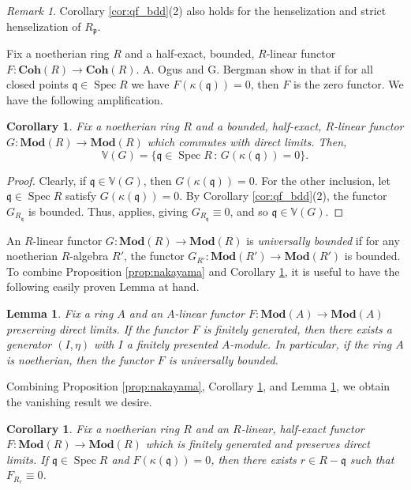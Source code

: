 \documentclass{amsart}
\theoremstyle{plain}
\newtheorem{cor}[thm]{Corollary}
\newtheorem{lem}[thm]{Lemma}
\theoremstyle{definition}
\theoremstyle{remark}
\newtheorem{rem}[thm]{Remark}
\numberwithin{equation}{section}
\newcommand{\suchthat}{\,:\,}
\DeclareMathOperator{\spec}{Spec}
\newcommand{\COH}[1]{\mathbf{Coh}({#1})}
\newcommand{\MOD}[1]{\mathbf{Mod}({#1})}
\newcommand{\Van}{\mathbb{V}}
\newcommand{\fndefn}[1]{\emph{{#1}}}
\begin{document}
\begin{rem}
  Corollary \ref{cor:qf_bdd}(2) also holds for the henselization and
  strict henselization of $R_{\mathfrak{p}}$.
\end{rem}
Fix a noetherian ring $R$ and a half-exact, bounded, $R$-linear
functor $F : \COH{R} \to \COH{R}$. A. Ogus and G. Bergman show in
\cite[Thm.~2.1]{MR0302633} that if for all closed points $\mathfrak{q}
\in \spec R$ we have $F(\kappa(\mathfrak{q})) = 0$, then $F$ is the
zero functor. We have the following amplification. 
\begin{cor}\label{cor:nakayama_new} 
  Fix a noetherian ring $R$ and a bounded, half-exact, $R$-linear
  functor $G :   \MOD{R} \to \MOD{R}$ which commutes with direct
  limits. Then,  
  \[
  \Van(G) =
  \{\mathfrak{q} \in \spec R \suchthat G(\kappa(\mathfrak{q})) = 0\}.
  \]
\end{cor}
\begin{proof}
  Clearly, if $\mathfrak{q} \in\Van(G)$, then $G(\kappa(\mathfrak{q}))
  = 0$. For the other inclusion, let $\mathfrak{q} \in \spec R$
  satisfy $G(\kappa(\mathfrak{q}))=0$. By Corollary \ref{cor:qf_bdd}(2),
  the functor $G_{R_{\mathfrak{q}}}$ is bounded. Thus, \cite[Thm.\
  2.1]{MR0302633} applies, giving $G_{R_{\mathfrak{q}}} \equiv
  0$, and so $\mathfrak{q} \in \Van(G)$.
\end{proof}
An $R$-linear functor $G :
\MOD{R} \to \MOD{R}$ is \fndefn{universally bounded} if for {any}
noetherian $R$-algebra $R'$, the functor $G_{R'} : \MOD{R'} \to
\MOD{R'}$ is bounded. To combine Proposition \ref{prop:nakayama} and
Corollary \ref{cor:nakayama_new}, it is useful to have the following
easily proven Lemma at hand. 
\begin{lem}\label{lem:nakayama2}
  Fix a ring $A$ and an $A$-linear functor $F : \MOD{A} \to \MOD{A}$
  preserving direct limits. If the functor $F$ is finitely generated,
  then there exists a generator $(I,\eta)$ with $I$ a finitely
  presented $A$-module. In particular, if the ring $A$ is noetherian,
  then the functor $F$ is universally bounded.
\end{lem}
Combining Proposition \ref{prop:nakayama}, Corollary
\ref{cor:nakayama_new}, and Lemma \ref{lem:nakayama2}, we obtain the
vanishing result we desire. 
\begin{cor}\label{cor:openness_van}
  Fix a noetherian ring $R$ and an $R$-linear, half-exact functor $F :
  \MOD{R} \to \MOD{R}$ which is finitely generated and preserves
  direct limits. If $\mathfrak{q}\in \spec R$ and
  $F(\kappa(\mathfrak{q})) = 0$, then there exists $r\in
  R-\mathfrak{q}$ such that $F_{R_r} \equiv 0$. 
\end{cor}
\end{document}

